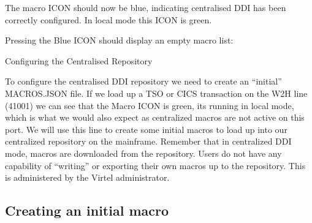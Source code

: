 \documentclass[letterpaper,10pt,english]{sphinxmanual}
\begin{document}
The macro ICON should now be blue, indicating centralised DDI has been correctly configured. In local mode this ICON is green.



Pressing the Blue ICON should display an empty macro list:



\ignorespaces 
Configuring the Centralised Repository

To configure the centralised DDI repository we need to create an “initial” MACROS.JSON file. If we load up a TSO or CICS transaction on the W2H line (41001) we can see that the Macro ICON is green, its running in local mode, which is what we would also expect as centralized macros are not active on this port. We will use this line to create some initial macros to load up into our centralized repository on the mainframe. Remember that in centralized DDI mode, macros are downloaded from the repository. Users do not have any capability of “writing” or exporting their own macros up to the repository. This is administered by the Virtel administrator.

\begin{sphinxVerbatim}[commandchars=\\\{\}]
\end{sphinxVerbatim}



\ignorespaces 

\subsection{Creating an initial macro}
\label{\detokenize{Customization:creating-an-initial-macro}}\label{\detokenize{Customization:index-92}}
\end{document}
